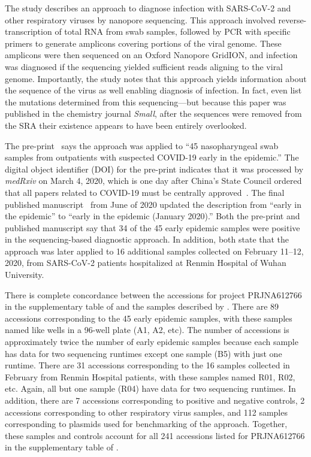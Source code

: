 \documentclass[9pt,twocolumn,twoside]{gsajnl_modified}
\begin{document}
The study describes an approach to diagnose infection with SARS-CoV-2 and other respiratory viruses by nanopore sequencing.
This approach involved reverse-transcription of total RNA from swab samples, followed by PCR with specific primers to generate amplicons covering portions of the viral genome.
These amplicons were then sequenced on an Oxford Nanopore GridION, and infection was diagnosed if the sequencing yielded sufficient reads aligning to the viral genome.
Importantly, the study notes that this approach yields information about the sequence of the virus as well enabling diagnosis of infection.
In fact, \citet{wang2020small} even list the mutations determined from this sequencing---but because this paper was published in the chemistry journal \textit{Small}, after the sequences were removed from the SRA their existence appears to have been entirely overlooked. 

The pre-print~\citep{wang2020medRxiv} says the approach was applied to ``45 nasopharyngeal swab samples from outpatients with suspected COVID-19 early in the epidemic.''
The digital object identifier (DOI) for the pre-print indicates that it was processed by \textit{medRxiv} on March 4, 2020, which is one day after China's State Council ordered that all papers related to COVID-19 must be centrally approved~\citep{Kang2020}.
The final published manuscript~\citep{wang2020small} from June of 2020 updated the description from ``early in the epidemic'' to ``early in the epidemic (January 2020).''
Both the pre-print and published manuscript say that 34 of the 45 early epidemic samples were positive in the sequencing-based diagnostic approach.
In addition, both state that the approach was later applied to 16 additional samples collected on February 11--12, 2020, from SARS-CoV-2 patients hospitalized at Renmin Hospital of Wuhan University.

There is complete concordance between the accessions for project PRJNA612766 in the supplementary table of \citet{farkas2020insights} and the samples described by \citet{wang2020medRxiv}.
There are 89 accessions corresponding to the 45 early epidemic samples, with these samples named like wells in a 96-well plate (A1, A2, etc).
The number of accessions is approximately twice the number of early epidemic samples because each sample has data for two sequencing runtimes except one sample (B5) with just one runtime.
 There are 31 accessions corresponding to the 16 samples collected in February from Renmin Hospital patients, with these samples named R01, R02, etc.
 Again, all but one sample (R04) have data for two sequencing runtimes.
 In addition, there are 7 accessions corresponding to positive and negative controls, 2 accessions corresponding to other respiratory virus samples, and 112 samples corresponding to plasmids used for benchmarking of the approach.
 Together, these samples and controls account for all 241 accessions listed for PRJNA612766 in the supplementary table of \citet{farkas2020insights}.
\end{document}
